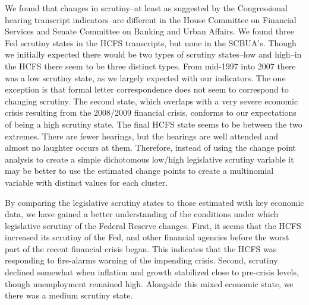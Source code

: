 \documentclass[a4paper]{article}\usepackage[]{graphicx}\usepackage[]{color}
\begin{document}
We found that changes in scrutiny--at least as suggested by the Congressional hearing transcript indicators--are different in the House Committee on Financial Services and Senate Committee on Banking and Urban Affairs. We found three Fed scrutiny states in the HCFS transcripts, but none in the SCBUA's. Though we initially expected there would be two types of scrutiny states--low and high--in the HCFS there seem to be three distinct types. From mid-1997 into 2007 there was a low scrutiny state, as we largely expected with our indicators. The one exception is that formal letter correspondence does not seem to correspond to changing scrutiny. The second state, which overlaps with a very severe economic crisis resulting from the 2008/2009 financial crisis, conforms to our expectations of being a high scrutiny state. The final HCFS state seems to be between the two extremes. There are fewer hearings, but the hearings are well attended and almost no laughter occurs at them. Therefore, instead of using the change point analysis to create a simple dichotomous low/high legislative scrutiny variable it may be better to use the estimated change points to create a multinomial variable with distinct values for each cluster.

By comparing the legislative scrutiny states to those estimated with key economic data, we have gained a better understanding of the conditions under which legislative scrutiny of the Federal Reserve changes. First, it seems that the HCFS increased its scrutiny of the Fed, and other financial agencies before the worst part of the recent financial crisis began. This indicates that the HCFS was responding to fire-alarms warning of the impending crisis. Second, scrutiny declined somewhat when inflation and growth stabilized close to pre-crisis levels, though unemployment remained high. Alongside this mixed economic state, we there was a medium scrutiny state.




\end{document}
